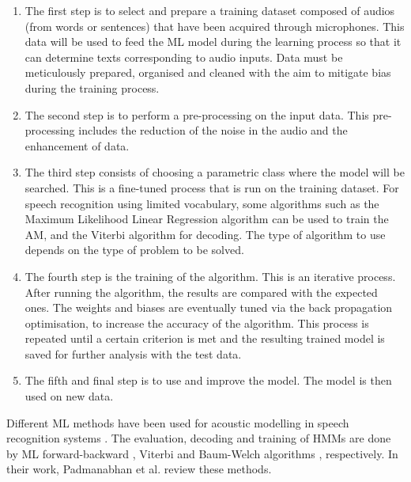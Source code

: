\begin{enumerate}
    \item The first step is to select and prepare a training dataset composed of audios (from words or sentences) that have been acquired through microphones. This data will be used to feed the ML model during the learning process so that it can determine texts corresponding to audio inputs. Data must be meticulously prepared, organised and cleaned with the aim to mitigate bias during the training process. 
    \item The second step is to perform a pre-processing on the input data. This pre-processing includes the reduction of the noise in the audio and the enhancement of data.
    \item The third step consists of choosing a parametric class where the model will be searched.  This is a fine-tuned process that is run on the training dataset. For speech recognition using limited vocabulary, some algorithms such as the Maximum Likelihood Linear Regression algorithm  can be used to train the AM, and the Viterbi algorithm  for decoding. The type of algorithm to use depends on the type of problem to be solved.
    \item The fourth step is the training of the algorithm. This is an iterative process. After running the algorithm, the results are compared with the expected ones. The weights and biases are eventually tuned  via the back propagation optimisation, to increase the accuracy of the algorithm. This process is repeated until a certain criterion is met and the resulting trained model is saved for further analysis with the test data.
    \item The fifth and final step is to use and improve the model. The model is then used on new data. 
\end{enumerate}
Different ML methods  have been used for acoustic modelling in speech recognition systems . The evaluation, decoding and training of HMMs are done by ML forward-backward , Viterbi  and Baum-Welch algorithms , respectively. In their work, Padmanabhan et al.  review these methods.

